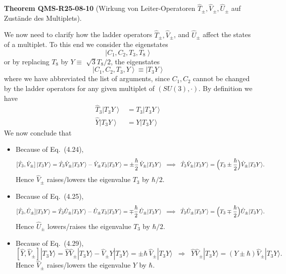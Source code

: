 \documentclass[10pt, letterpaper]{article}
\newcommand{\CustomHeading}[3]{%
  \par\medskip\noindent%
  \textbf{#1 #2} \textnormal{(#3)}.\enskip%
}
\newenvironment{THEO}[2]{\begin{unitbox}\CustomHeading{Theorem}{#1}{#2}}{\end{unitbox}}
\begin{document}
\begin{THEO}{QMS-R25-08-10}{Wirkung von Leiter-Operatoren $\hat{T}_{ \pm}, \hat{V}_{ \pm}, \hat{U}_{ \pm}$ auf Zustände des Multiplets}
We now need to clarify how the ladder operators $\hat{T}_{ \pm}, \hat{V}_{ \pm}$, and $\hat{U}_{ \pm}$ affect the states of a multiplet. To this end we consider the eigenstates
$$\left|C_1, C_2, T_3, T_8\right\rangle$$
or by replacing $T_{8}$ by $Y \equiv$ $\sqrt{3} T_{8} / 2$, the eigenstates
$$
\left|C_{1}, C_{2}, T_{3}, Y\right\rangle \equiv\left|T_{3} Y\right\rangle
$$
where we have abbreviated the list of arguments, since $C_{1}, C_{2}$ cannot be changed by the ladder operators for any given multiplet of $(S U(3), \cdot)$. By definition we have
$$
\begin{aligned}
\hat{T}_{3}\left|T_{3} Y\right\rangle & =T_{3}\left|T_{3} Y\right\rangle \\
\hat{Y}\left|T_{3} Y\right\rangle & =Y\left|T_{3} Y\right\rangle
\end{aligned}
$$
We now conclude that
\begin{itemize}
    \item[(i)] Because of Eq.~(4.24),
    \[
        [\hat T_{3},\hat V_{\pm}]\,|T_3Y\rangle
        =\hat T_{3}\hat V_{\pm}|T_3Y\rangle-\hat V_{\pm}T_{3}|T_3Y\rangle
        =\pm\frac{\hbar}{2}\,\hat V_{\pm}|T_3Y\rangle
        \;\;\Longrightarrow\;\;
        \hat T_{3}\hat V_{\pm}|T_3Y\rangle
        =\Bigl(T_{3}\pm\frac{\hbar}{2}\Bigr)\hat V_{\pm}|T_3Y\rangle.
    \]
    Hence $\hat V_{\pm}$ raises/lowers the eigenvalue $T_{3}$ by $\hbar/2$.

    \item[(ii)] Because of Eq.~(4.25),
    \[
        [\hat T_{3},\hat U_{\pm}]|T_3Y\rangle
        =\hat T_{3}\hat U_{\pm}|T_3Y\rangle-\hat U_{\pm}T_{3}|T_3Y\rangle
        =\mp\frac{\hbar}{2}\,\hat U_{\pm}|T_3Y\rangle
        \;\;\Longrightarrow\;\;
        \hat T_{3}\hat U_{\pm}|T_3Y\rangle
        =\Bigl(T_{3}\mp\frac{\hbar}{2}\Bigr)\hat U_{\pm}|T_3Y\rangle.
    \]
    Hence $\hat U_{\pm}$ lowers/raises the eigenvalue $T_{3}$ by $\hbar/2$.

    \item[(iii)] Because of Eq.~(4.29),
    \[
        [\hat Y,\hat V_{\pm}]|T_3Y\rangle
        =\hat Y\hat V_{\pm}|T_3Y\rangle-\hat V_{\pm}Y|T_3Y\rangle
        =\pm\hbar\,\hat V_{\pm}|T_3Y\rangle
        \;\;\Longrightarrow\;\;
        \hat Y\hat V_{\pm}|T_3Y\rangle
        =(Y\pm\hbar)\hat V_{\pm}|T_3Y\rangle.
    \]
    Hence $\hat V_{\pm}$ raises/lowers the eigenvalue $Y$ by $\hbar$.


\end{itemize}
\end{THEO}
\end{document}
